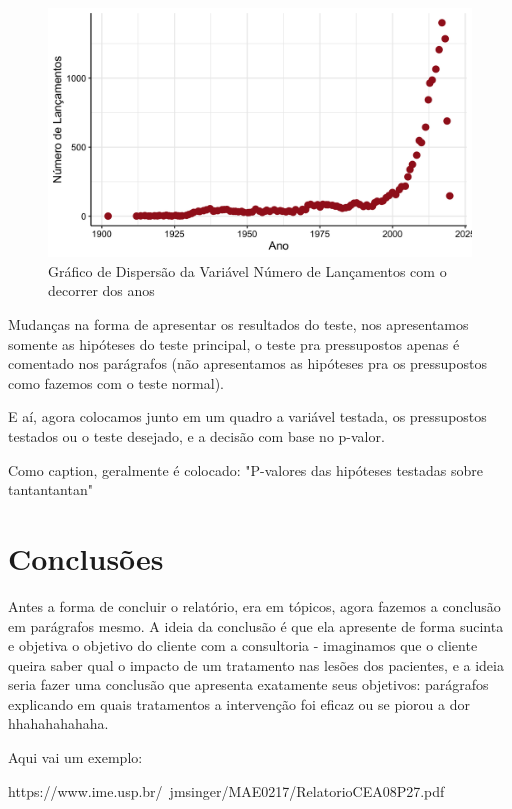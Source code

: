 \documentclass[a4paper, 12pt]{article} %
\begin{document}
\begin{figure}[H]
    \centering
    \includegraphics[scale=1]{Fig_Lancamentos_Ano.png}
    \caption{Gráfico de Dispersão da Variável Número de Lançamentos com o decorrer dos anos}
    \label{fig:my_label}
\end{figure}

\begin{quadro}[H]
\centering
\caption{Nova forma de apresentar os resultados do teste, com apenas os p-valores}
\label{R-Q-Teste-1}
\vspace{0.1cm}
\end{quadro}

Mudanças na forma de apresentar os resultados do teste, nos apresentamos somente as hipóteses do teste principal, o teste pra pressupostos apenas é comentado nos parágrafos (não apresentamos as hipóteses pra os pressupostos como fazemos com o teste normal).

E aí, agora colocamos junto em um quadro a variável testada, os pressupostos testados ou o teste desejado, e a decisão com base no p-valor.

Como caption, geralmente é colocado: "P-valores das hipóteses testadas sobre tantantantan"

\section{Conclusões}

Antes a forma de concluir o relatório, era em tópicos, agora fazemos a conclusão em parágrafos mesmo. A ideia da conclusão é que ela apresente de forma sucinta e objetiva o objetivo do cliente com a consultoria - imaginamos que o cliente queira saber qual o impacto de um tratamento nas lesões dos pacientes, e a ideia seria fazer uma conclusão que apresenta exatamente seus objetivos: parágrafos explicando em quais tratamentos a intervenção foi eficaz ou se piorou a dor hhahahahahaha.

Aqui vai um exemplo: 

https://www.ime.usp.br/~jmsinger/MAE0217/RelatorioCEA08P27.pdf
\end{document}
